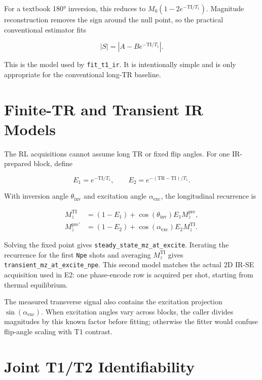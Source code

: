 For a textbook 180° inversion, this reduces to
\(M_0(1 - 2e^{-\mathrm{TI}/T_1})\). Magnitude reconstruction removes the
sign around the null point, so the practical conventional estimator fits

\begin{equation}
    |S| = \left|A - B e^{-\mathrm{TI}/T_1}\right|.
\end{equation}

This is the model used by \texttt{fit\_t1\_ir}. It is intentionally
simple and is only appropriate for the conventional long-TR baseline.

\section{Finite-TR and Transient IR Models}

The RL acquisitions cannot assume long TR or fixed flip angles. For one
IR-prepared block, define

\begin{equation}
    E_1 = e^{-\mathrm{TI}/T_1},
    \qquad
    E_2 = e^{-(\mathrm{TR}-\mathrm{TI})/T_1}.
\end{equation}

With inversion angle \(\theta_{\mathrm{inv}}\) and excitation angle
\(\alpha_{\mathrm{exc}}\), the longitudinal recurrence is

\begin{align}
    M_z^{\mathrm{TI}}
    &=
    (1 - E_1) +
    \cos(\theta_{\mathrm{inv}})E_1M_z^{\mathrm{pre}},
    \\
    M_z^{\mathrm{pre}\prime}
    &=
    (1 - E_2) +
    \cos(\alpha_{\mathrm{exc}})E_2M_z^{\mathrm{TI}}.
\end{align}

Solving the fixed point gives
\texttt{steady\_state\_mz\_at\_excite}. Iterating the recurrence for the
first \texttt{Npe} shots and averaging \(M_z^{\mathrm{TI}}\) gives
\texttt{transient\_mz\_at\_excite\_npe}. This second model matches the
actual 2D IR-SE acquisition used in E2: one phase-encode row is acquired
per shot, starting from thermal equilibrium.

The measured transverse signal also contains the excitation projection
\(\sin(\alpha_{\mathrm{exc}})\). When excitation angles vary across
blocks, the caller divides magnitudes by this known factor before
fitting; otherwise the fitter would confuse flip-angle scaling with T1
contrast.

\section{Joint T1/T2 Identifiability}

